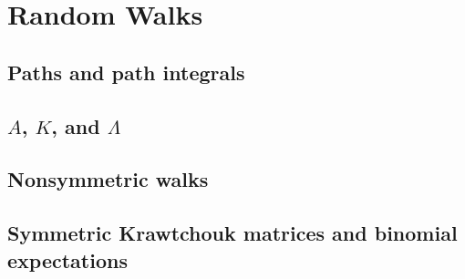 \chapter{Random Walks}
\label{ch:2}
\section{Paths and path integrals}
\label{sec:2-1}

\section{$A$, $K$, and $\Lambda$}
\label{sec:2-2}

\section{Nonsymmetric walks}
\label{sec:2-3}

\section{Symmetric Krawtchouk matrices and binomial expectations}
\label{sec:2-4}

